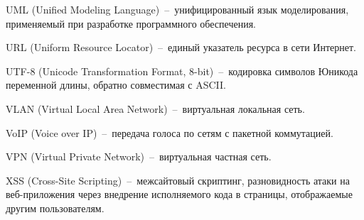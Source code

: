 UML (Unified Modeling Language)~--~унифицированный язык моделирования, применяемый при разработке программного обеспечения.

URL (Uniform Resource Locator)~--~единый указатель ресурса в сети Интернет.

UTF-8 (Unicode Transformation Format, 8-bit)~--~кодировка символов Юникода переменной длины, обратно совместимая с ASCII.

VLAN (Virtual Local Area Network)~--~виртуальная локальная сеть.

VoIP (Voice over IP)~--~передача голоса по сетям с пакетной коммутацией.

VPN (Virtual Private Network)~--~виртуальная частная сеть.

XSS (Cross-Site Scripting)~--~межсайтовый скриптинг, разновидность атаки на веб-приложения через внедрение исполняемого кода в страницы, отображаемые другим пользователям.
